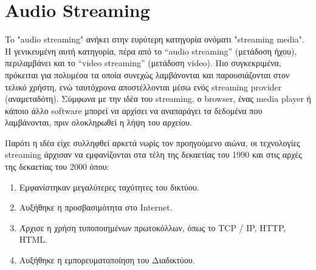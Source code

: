 \section{Audio Streaming}
To "audio streaming" ανήκει στην ευρύτερη κατηγορία ονόματι "streaming media".
Η γενικευμένη αυτή κατηγορία, πέρα από το “audio streaming” (μετάδοση ήχου), περιλαμβάνει και το “video streaming” (μετάδοση video).
Πιο συγκεκριμένα, πρόκειται για πολυμέσα τα οποία συνεχώς λαμβάνονται και παρουσιάζονται στον τελικό χρήστη, ενώ ταυτόχρονα αποστέλλονται μέσω ενός streaming provider (αναμεταδότη).
Σύμφωνα με την ιδέα του streaming, ο browser, ένας media player ή κάποιο άλλο software μπορεί να αρχίσει
να αναπαράγει τα δεδομένα που λαμβάνονται, πριν ολοκληρωθεί η λήψη του αρχείου.

Παρότι η ιδέα είχε συλληφθεί αρκετά νωρίς τον προηγούμενο αιώνα, οι τεχνολογίες streaming άρχισαν να εμφανίζονται στα τέλη της δεκαετίας του 1990 και στις αρχές της δεκαετίας του 2000 όπου:
\begin{enumerate}
\item Εμφανίστηκαν μεγαλύτερες ταχύτητες του δικτύου.
\item Αυξήθηκε η προσβασιμότητα στο Internet.
\item Άρχισε η χρήση τυποποιημένων πρωτοκόλλων, όπως το TCP / IP, HTTP, HTML.
\item Αυξήθηκε η εμπορευματοποίηση του Διαδικτύου.
\end{enumerate}

